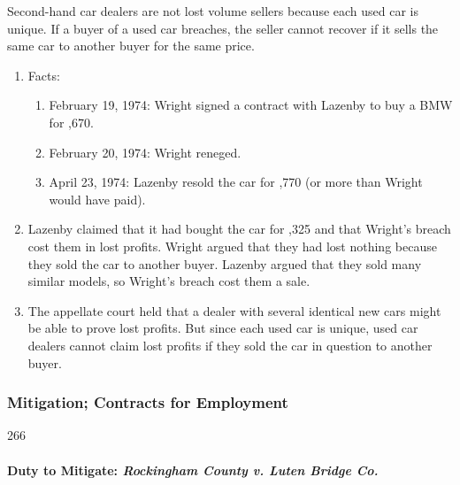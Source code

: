 Second-hand car dealers are not lost volume sellers because each used car is 
unique. If a buyer of a used car breaches, the seller cannot recover if it 
sells the same car to another buyer for the same price.

\begin{enumerate}
    \item Facts:
    \begin{enumerate}
        \item February 19, 1974: Wright signed a contract with Lazenby to buy 
        a BMW for ,670.
        \item February 20, 1974: Wright reneged.
        \item April 23, 1974: Lazenby resold the car for ,770 
        (or  more than Wright would have paid).
    \end{enumerate}
    \item Lazenby claimed that it had bought the car for ,325 
    and that Wright's breach cost them  in lost profits. 
    Wright argued that they had lost nothing because they sold the car to 
    another buyer. Lazenby argued that they sold many similar models, so 
    Wright's breach cost them a sale.
    \item The appellate court held that a dealer with several identical new 
    cars might be able to prove lost profits. But since each used car is 
    unique, used car dealers cannot claim lost profits if they sold the car in 
    question to another buyer.
\end{enumerate}

\subsubsection{Mitigation; Contracts for Employment} 266

\paragraph{Duty to Mitigate: \emph{Rockingham County v. Luten Bridge Co.}}

